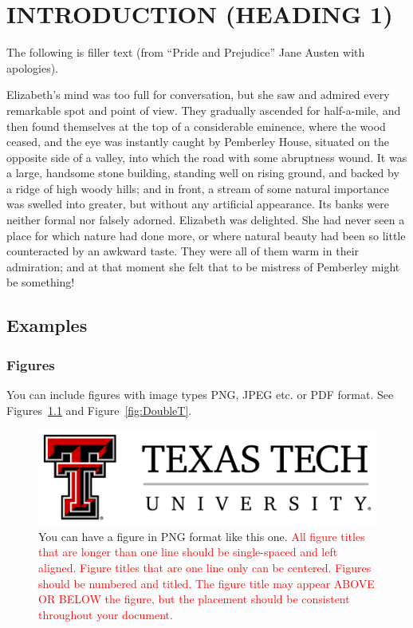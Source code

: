 \chapter{INTRODUCTION (HEADING 1)}
\label{ch:introduction}

The following is filler text (from “Pride and Prejudice” Jane Austen with apologies).

Elizabeth's mind was too full for conversation, but she saw and admired every remarkable spot and point of view. They gradually ascended for half-a-mile, and then found themselves at the top of a considerable eminence, where the wood ceased, and the eye was instantly caught by Pemberley House, situated on the opposite side of a valley, into which the road with some abruptness wound. It was a large, handsome stone building, standing well on rising ground, and backed by a ridge of high woody hills; and in front, a stream of some natural importance was swelled into greater, but without any artificial appearance. Its banks were neither formal nor falsely adorned. Elizabeth was delighted. She had never seen a place for which nature had done more, or where natural beauty had been so little counteracted by an awkward taste. They were all of them warm in their admiration; and at that moment she felt that to be mistress of Pemberley might be something!

\section{Examples}

\subsection{Figures}

You can include figures with image types PNG, JPEG etc. or PDF format. See Figures~\ref{fig:TTU} and Figure~\ref{fig:DoubleT}.

\begin{figure}[!htb]
    \centering
    \includegraphics[width=\linewidth]{chapters/figures/TTU.png}
    \caption{You can have a figure in PNG format like this one. \textcolor{red}{All figure titles that are longer than one line should be single-spaced and left aligned.  Figure titles that are one line only can be centered. Figures should be numbered and titled. The figure title may appear ABOVE OR BELOW the figure, but the placement should be consistent throughout your document.}}
    \label{fig:TTU}    
\end{figure}


